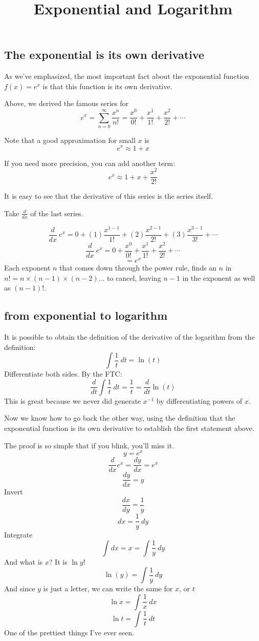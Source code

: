 \documentclass[11pt, oneside]{article}
\title{Exponential and Logarithm}
\date{}
\begin{document}
\maketitle
\Large

\subsection*{The exponential is its own derivative}

As we've emphasized, the most important fact about the exponential function $f(x) = e^x$ is that this function is its own derivative.  

Above, we derived the famous series for
\[ e^x = \sum_{n=0}^{\infty} \frac{x^n}{n!} = \frac{x^{0}}{0!} + \frac{x^{1}}{1!} + \frac{x^{2}}{2!} + \cdots  \]

Note that a good approximation for small $x$ is
\[ e^x \approx 1 + x \]

If you need more precision, you can add another term:
\[ e^x \approx 1 + x + \frac{x^2}{2!} \]


It is easy to see that the derivative of this series is the series itself.

Take $\frac{d}{dx}$ of the last series.

\[ \frac{d}{dx} \ e^x = 0 + (1)\frac{x^{1-1}}{1!} + (2)\frac{x^{2-1}}{2!} + (3)\frac{x^{3-1}}{3!} + \cdots  \]
\[ \frac{d}{dx} \ e^x = 0 + \frac{x^{0}}{0!} + \frac{x^{1}}{1!} + \frac{x^{2}}{2!} + \cdots  \]
\[ = e^x \]
Each exponent $n$ that comes down through the power rule, finds an $n$ in $n!=n \times (n-1) \times (n-2) \dots $ to cancel, leaving $n-1$ in the exponent as well as $(n-1)!$.

\subsection*{from exponential to logarithm}
It is possible to obtain the definition of the derivative of the logarithm from the definition:
\[ \int \frac{1}{t} \ dt = \ln(t) \]
Differentiate both sides.  By the FTC:
\[ \frac{d}{dt} \int \frac{1}{t} \ dt  = \frac{1}{t}  = \frac{d}{dt} \ln(t) \]
This is great because we never did generate $x^{-1}$ by differentiating powers of $x$.  

Now we know how to go back the other way, using the definition that the exponential function is its own derivative to establish the first statement above.

The proof is so simple that if you blink, you'll miss it.
\[ y = e^x \]
\[ \frac{d}{dx} e^x = \frac{dy}{dx} = e^x  \]
\[ \frac{dy}{dx} = y \]
Invert
\[ \frac{dx}{dy} = \frac{1}{y} \]
\[ dx = \frac{1}{y} \ dy \]
Integrate
\[ \int dx = x = \int \frac{1}{y} \ dy \]
And what is $x$?  It is $\ln y$!
\[ \ln(y) = \int \frac{1}{y} \ dy \]
And since $y$ is just a letter, we can write the same for $x$, or $t$
\[ \ln x = \int \frac{1}{x} \ dx \]
\[ \ln t = \int \frac{1}{t} \ dt \]
One of the prettiest things I've ever seen.
\end{document}
